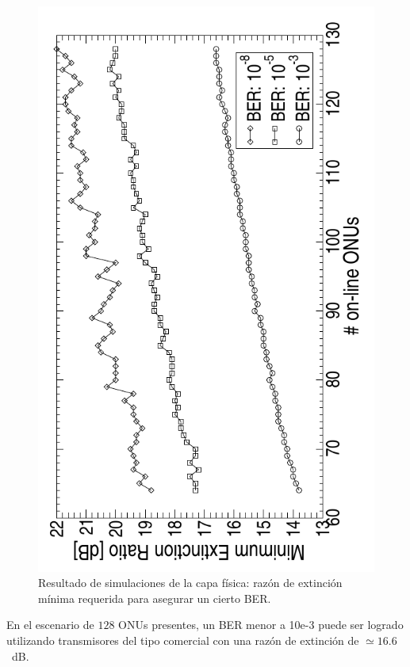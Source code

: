 \begin{figure}[!t]
    \centering
      \includegraphics[angle= 270, width=6 in]{graphs/orte03.pdf}
      \caption{Resultado de simulaciones de la capa física: razón de extinción mínima requerida para asegurar un cierto BER.}
      \label{sim:optical}
\end{figure}
En el escenario de $128$ ONUs presentes, un BER menor a 10e-3 puede ser logrado utilizando transmisores del tipo comercial con una razón de extinción de $\simeq16.6$~dB.
